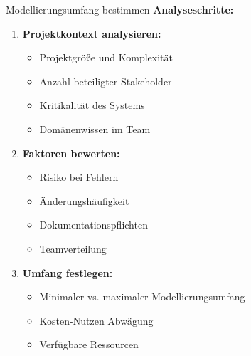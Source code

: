 \begin{KR}{Modellierungsumfang bestimmen}
\textbf{Analyseschritte:}
\begin{enumerate}
    \item \textbf{Projektkontext analysieren:}
    \begin{itemize}
        \item Projektgröße und Komplexität
        \item Anzahl beteiligter Stakeholder
        \item Kritikalität des Systems
        \item Domänenwissen im Team
    \end{itemize}
    
    \item \textbf{Faktoren bewerten:}
    \begin{itemize}
        \item Risiko bei Fehlern
        \item Änderungshäufigkeit
        \item Dokumentationspflichten
        \item Teamverteilung
    \end{itemize}
    
    \item \textbf{Umfang festlegen:}
    \begin{itemize}
        \item Minimaler vs. maximaler Modellierungsumfang
        \item Kosten-Nutzen Abwägung
        \item Verfügbare Ressourcen
    \end{itemize}
\end{enumerate}
\end{KR}

